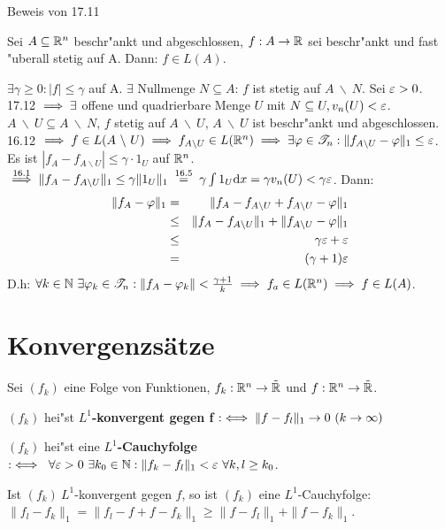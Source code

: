 \documentclass[a4paper,twoside,DIV15,BCOR12mm]{scrbook}
\begin{document}
\begin{beweis}
Beweis von 17.11
\end{beweis}

\begin{satz}
Sei $A\subseteq\mathbb{R}^n$ beschr"ankt und abgeschlossen, $f:A\to\mathbb{R}$ sei beschr"ankt und fast "uberall stetig auf A. Dann: $f\in L(A)$.
\end{satz}

\begin{beweis}
$\exists \gamma\ge 0: |f|\le\gamma$ auf A. $\exists$ Nullmenge $N\subseteq A$: $f$ ist stetig auf $A\ \backslash\ N$. Sei $\varepsilon>0$. 17.12 $\implies\exists$ offene und quadrierbare Menge $U$ mit $N\subseteq U, v_n(U)<\varepsilon$. $A\ \backslash\ U\subseteq A\ \backslash\ N$, $f$ stetig auf $A\ \backslash\ U$, $A\ \backslash\ U$ ist beschr"ankt und abgeschlossen. 16.12 $\implies f\in L(A\ \backslash\ U)\implies f_{A\backslash U}\in L(\mathbb{R}^n)\implies \exists \varphi\in\mathscr{T}_n:\|f_{A\backslash U}-\varphi\|_1\le\varepsilon$. Es ist $|f_A - f_{A\backslash U}|\le\gamma\cdot 1_U$ auf $\mathbb{R}^n$. $\overset{16.1}{\folgt}\|f_A-f_{A\backslash U}\|_1\le\gamma\|1_U\|_1\gleichnach{16.5}\gamma\int 1_U\text{d}x=\gamma v_n(U)<\gamma\ep$. Dann:
\begin{eqnarray*}
\|f_A-\varphi\|_1 & = & \|f_A-f_{A\backslash U}+f_{A\backslash U}-\varphi\|_1 \\
&\le&\|f_A-f_{A\backslash U}\|_1+\|f_{A\backslash U}-\varphi\|_1\\
&\le&\gamma\varepsilon+\varepsilon\\
&=&(\gamma+1)\varepsilon
\end{eqnarray*}
D.h: $\forall k\in\MdN\ \exists\varphi_k\in\T_n:\|f_A-\varphi_k\|<\frac{\gamma+1}{k}\folgt f_a\in L(\MdR^n)\folgt f\in L(A)$.
\end{beweis}

\chapter{Konvergenzsätze}

\begin{definition}
Sei $(f_k)$ eine Folge von Funktionen, $f_k:\mathbb{R}^n\to\tilde{\mathbb{R}}$ und $f:\mathbb{R}^n\to\tilde{\mathbb{R}}$.
\begin{liste}
\item $(f_k)$ hei"st \textbf{$L^1$-konvergent gegen f} $:\equizu \|f-f_l\|_1\to 0\ (k\to\infty)$
\item $(f_k)$ hei"st eine \textbf{$L^1$-Cauchyfolge} $:\iff\ \forall \varepsilon>0\ \exists k_0\in \mathbb{N}: \|f_k-f_l\|_1<\varepsilon\ \forall k,l\ge k_0$.
\end{liste}
Ist $(f_k)\  L^1$-konvergent gegen $f$, so ist $(f_k)$ eine $L^1$-Cauchyfolge: $\|f_l-f_k\|_1=\|f_l-f+f-f_k\|_1\ge\|f-f_l\|_1+\|f-f_k\|_1$.
\end{definition}
\end{document}
